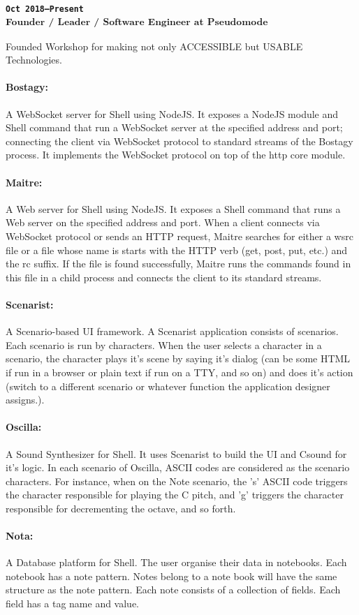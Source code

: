 \subsubsection{\textsubscript{\uppercase{\texttt{Oct 2018--Present}}\\
Founder / Leader / Software Engineer at Pseudomode}}
Founded Workshop for making not only \uppercase{accessible} but \uppercase{usable} Technologies.
\paragraph{Bostagy:}
A WebSocket server for Shell using NodeJS.
It exposes a NodeJS module and Shell command that run a WebSocket server at the specified address and port;
connecting the client via WebSocket protocol to standard streams of the Bostagy process.
It implements the WebSocket protocol on top of the http core module.
\paragraph{Maitre:}
A Web server for Shell using NodeJS.
It exposes a Shell command that runs a Web server on the specified address and port.
When a client connects via WebSocket protocol or sends an HTTP request,
Maitre searches for either a wsrc file or a file whose name is starts with the HTTP verb (get, post, put, etc.) and the rc suffix.
If the file is found successfully, Maitre runs the commands found in this file in a child process and connects the client to its standard streams.
\paragraph{Scenarist:}
A Scenario-based UI framework.
A Scenarist application consists of scenarios.
Each scenario is run by characters.
When the user selects a character in a scenario,
the character plays it's scene by saying it's dialog (can be some HTML if run in a browser or plain text if run on a TTY, and so on)
and does it's action (switch to a different scenario or whatever function the application designer assigns.).
\paragraph{Oscilla:}
A Sound Synthesizer for Shell.
It uses Scenarist to build the UI and Csound for it's logic.
In each scenario of Oscilla,
ASCII codes are considered as the scenario characters.
For instance, when on the Note scenario,
the 's' ASCII code triggers the character responsible for playing the C pitch,
and 'g' triggers the character responsible for decrementing the octave, and so forth.
\paragraph{Nota:}
A Database platform for Shell.
The user organise their data in notebooks.
Each notebook has a note pattern.
Notes belong to a note book will have the same structure as the note pattern.
Each note consists of a collection of fields.
Each field has a tag name and value.
